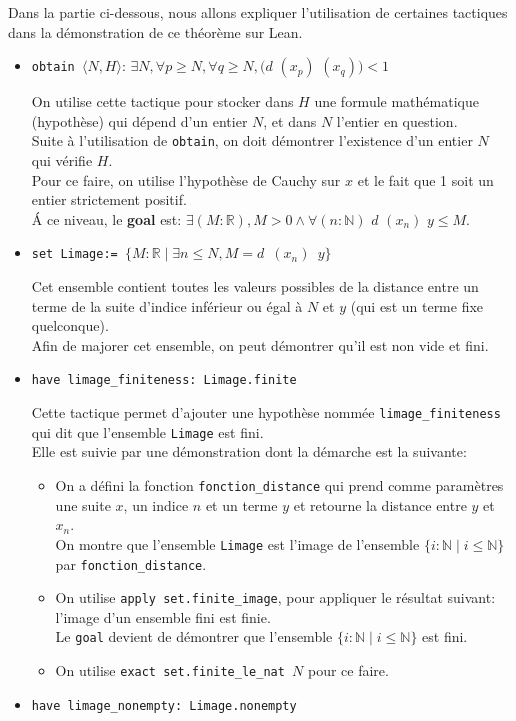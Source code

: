 Dans la partie ci-dessous, nous allons expliquer l'utilisation de certaines tactiques dans la démonstration de ce théorème sur Lean.\\
\begin{itemize}
    \item \texttt{obtain $\langle N, H \rangle $}: $\exists N, \forall p \geq N, \forall q \geq N, (d$ $(x_p)$ $(x_q)) < 1$
    
    On utilise cette tactique pour stocker dans $H$ une formule mathématique (hypothèse) qui dépend d'un entier $N$, et dans $N$ l'entier en question. \\ Suite à l'utilisation de \texttt{obtain}, on doit démontrer l'existence d'un entier $N$ qui vérifie $H$.\\ Pour ce faire, on utilise l'hypothèse de Cauchy sur $x$ et le fait que 1 soit un entier strictement positif.\\
    \'A ce niveau, le \textbf{goal} est: $\exists (M:\mathbb{R}), M > 0 \wedge \forall (n : \mathbb{N})$ $d$ $(x_n)$ $y \leq M$.
    \item \texttt{set Limage:= $\big\{ M: \mathbb{R} \mid \exists n\leq N, M = d$ $(x_n)$ $y\big\}$}
    
    
    Cet ensemble contient toutes les valeurs possibles de la distance entre un terme de la suite d'indice inférieur ou égal à $N$ et $y$ (qui est un terme fixe quelconque).\\ Afin de majorer cet ensemble, on peut démontrer qu'il est non vide et fini.
    \item \texttt{have limage\_finiteness: Limage.finite}
    
    
     Cette tactique permet d'ajouter une hypothèse nommée \texttt{limage\_finiteness} qui dit que l'ensemble \texttt{Limage} est fini.\\ Elle est suivie par une démonstration dont la démarche est la suivante:
    \begin{itemize}
         \item On a défini la fonction \texttt{fonction\_distance} qui prend comme paramètres une suite $x$, un indice $n$ et un terme $y$ et retourne la distance entre $y$ et $x_n$. \\ On montre que l'ensemble \texttt{Limage} est l'image de l'ensemble $\big\{i:\mathbb{N}\mid i\leq \mathbb{N}\big\}$ par \texttt{fonction\_distance}.
        \item On utilise \texttt{apply set.finite\_image}, pour appliquer le résultat suivant: l'image d'un ensemble fini est finie. \\ Le \texttt{goal} devient de démontrer que l'ensemble $\big\{i:\mathbb{N}\mid i\leq \mathbb{N}\big\}$ est fini.
        \item On utilise \texttt{exact set.finite\_le\_nat $N$} pour ce faire.
    \end{itemize}
    \item \texttt{have limage\_nonempty: Limage.nonempty} 
    

\end{itemize}
